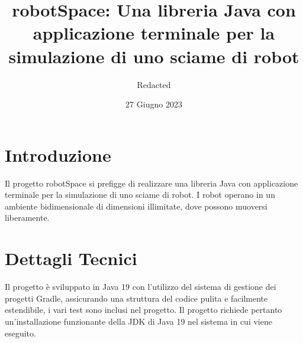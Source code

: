 \documentclass[12pt]{article}
\title{robotSpace: Una libreria Java con applicazione terminale per la simulazione di uno sciame di robot}
\author{ Redacted }
\date{27 Giugno 2023}
\begin{document}
    \maketitle

    \section{Introduzione}
    Il progetto robotSpace si prefigge di realizzare una libreria Java con applicazione terminale per la simulazione di uno sciame di robot. I robot operano in un ambiente bidimensionale di dimensioni illimitate, dove possono muoversi liberamente.

    \section{Dettagli Tecnici}
    Il progetto è sviluppato in Java 19 con l'utilizzo del sistema di gestione dei progetti Gradle, assicurando una struttura del codice pulita e facilmente estendibile, i vari test sono inclusi nel progetto. Il progetto richiede pertanto un'installazione funzionante della JDK di Java 19 nel sistema in cui viene eseguito.
\end{document}
